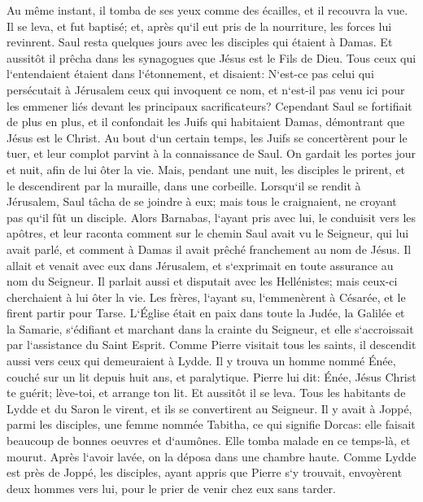 \verse Au même instant, il tomba de ses yeux comme des écailles, et il recouvra la vue. Il se leva, et fut baptisé; 
\verse et, après qu`il eut pris de la nourriture, les forces lui revinrent. Saul resta quelques jours avec les disciples qui étaient à Damas. 
\verse Et aussitôt il prêcha dans les synagogues que Jésus est le Fils de Dieu. 
\verse Tous ceux qui l`entendaient étaient dans l`étonnement, et disaient: N`est-ce pas celui qui persécutait à Jérusalem ceux qui invoquent ce nom, et n`est-il pas venu ici pour les emmener liés devant les principaux sacrificateurs? 
\verse Cependant Saul se fortifiait de plus en plus, et il confondait les Juifs qui habitaient Damas, démontrant que Jésus est le Christ. 
\verse Au bout d`un certain temps, les Juifs se concertèrent pour le tuer, 
\verse et leur complot parvint à la connaissance de Saul. On gardait les portes jour et nuit, afin de lui ôter la vie. 
\verse Mais, pendant une nuit, les disciples le prirent, et le descendirent par la muraille, dans une corbeille. 
\verse Lorsqu`il se rendit à Jérusalem, Saul tâcha de se joindre à eux; mais tous le craignaient, ne croyant pas qu`il fût un disciple. 
\verse Alors Barnabas, l`ayant pris avec lui, le conduisit vers les apôtres, et leur raconta comment sur le chemin Saul avait vu le Seigneur, qui lui avait parlé, et comment à Damas il avait prêché franchement au nom de Jésus. 
\verse Il allait et venait avec eux dans Jérusalem, et s`exprimait en toute assurance au nom du Seigneur. 
\verse Il parlait aussi et disputait avec les Hellénistes; mais ceux-ci cherchaient à lui ôter la vie. 
\verse Les frères, l`ayant su, l`emmenèrent à Césarée, et le firent partir pour Tarse. 
\verse L`Église était en paix dans toute la Judée, la Galilée et la Samarie, s`édifiant et marchant dans la crainte du Seigneur, et elle s`accroissait par l`assistance du Saint Esprit. 
\verse Comme Pierre visitait tous les saints, il descendit aussi vers ceux qui demeuraient à Lydde. 
\verse Il y trouva un homme nommé Énée, couché sur un lit depuis huit ans, et paralytique. 
\verse Pierre lui dit: Énée, Jésus Christ te guérit; lève-toi, et arrange ton lit. Et aussitôt il se leva. 
\verse Tous les habitants de Lydde et du Saron le virent, et ils se convertirent au Seigneur. 
\verse Il y avait à Joppé, parmi les disciples, une femme nommée Tabitha, ce qui signifie Dorcas: elle faisait beaucoup de bonnes oeuvres et d`aumônes. 
\verse Elle tomba malade en ce temps-là, et mourut. Après l`avoir lavée, on la déposa dans une chambre haute. 
\verse Comme Lydde est près de Joppé, les disciples, ayant appris que Pierre s`y trouvait, envoyèrent deux hommes vers lui, pour le prier de venir chez eux sans tarder. 
